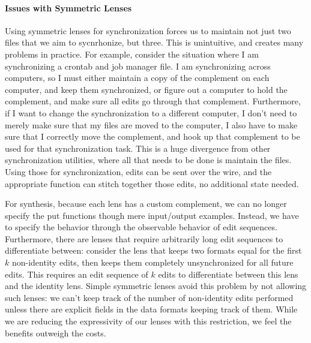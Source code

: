 \documentclass[acmsmall,screen,anonymous]{acmart}
\begin{document}
\paragraph*{Issues with Symmetric Lenses} Using symmetric lenses for
synchronization forces us to maintain not just two files that we aim to
sycnrhonize, but three. This is unintuitive, and creates many problems in 
practice. For example, consider the situation where I am synchronizing a crontab
and job manager file. I am synchronizing across computers, so I must either
maintain a copy of the complement on each computer, and keep them synchronized,
or figure out a computer to hold the complement, and make sure all edits go
through that complement. Furthermore, if I want to change the synchronization to
a different computer, I don't need to merely make sure that my files are moved
to the computer, I also have to make sure that I correctly move the complement,
and hook up that complement to be used for that synchronization task. This is a
huge divergence from other synchronization utilities, where all
that needs to be 
done is maintain the files. Using those for synchronization, edits can be sent
over the wire, and the appropriate function can stitch together those edits, no
additional state needed.

For synthesis, because each lens has a custom complement, we can no longer
specify the put functions though mere input/output examples.  Instead, we have
to specify the behavior through the observable behavior of edit sequences.
Furthermore, there are lenses that require arbitrarily long edit sequences to
differentiate between: consider the lens that keeps two formats equal for the
first $k$ non-identity edits, then keeps them completely unsynchronized for all
future edits.  This requires an edit sequence of $k$ edits to differentiate
between this lens and the identity lens.  Simple symmetric lenses avoid this
problem by not allowing such lenses: we can't keep track of the number of
non-identity edits performed unless there are explicit fields in the data
formats keeping track of them.  While we are reducing the expressivity of our
lenses with this restriction, we feel the benefits outweigh the costs.
\end{document}
